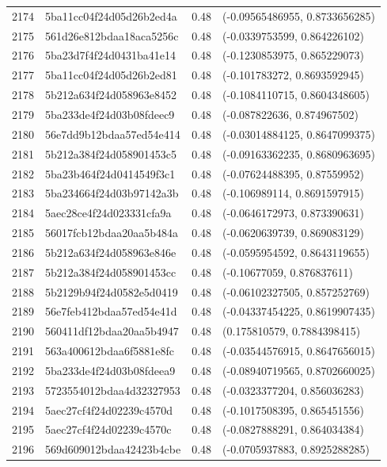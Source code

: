 \begin{table}[ht]
\begin{tabular}{rlrl}
  2174 & 5ba11cc04f24d05d26b2ed4a & 0.48 & (-0.09565486955, 0.8733656285) \\ 
  2175 & 561d26e812bdaa18aca5256c & 0.48 & (-0.0339753599, 0.864226102) \\ 
  2176 & 5ba23d7f4f24d0431ba41e14 & 0.48 & (-0.1230853975, 0.865229073) \\ 
  2177 & 5ba11cc04f24d05d26b2ed81 & 0.48 & (-0.101783272, 0.8693592945) \\ 
  2178 & 5b212a634f24d058963e8452 & 0.48 & (-0.1084110715, 0.8604348605) \\ 
  2179 & 5ba233de4f24d03b08fdeec9 & 0.48 & (-0.087822636, 0.874967502) \\ 
  2180 & 56e7dd9b12bdaa57ed54e414 & 0.48 & (-0.03014884125, 0.8647099375) \\ 
  2181 & 5b212a384f24d058901453c5 & 0.48 & (-0.09163362235, 0.8680963695) \\ 
  2182 & 5ba23b464f24d0414549f3c1 & 0.48 & (-0.07624488395, 0.87559952) \\ 
  2183 & 5ba234664f24d03b97142a3b & 0.48 & (-0.106989114, 0.8691597915) \\ 
  2184 & 5aec28ce4f24d023331cfa9a & 0.48 & (-0.0646172973, 0.873390631) \\ 
  2185 & 56017fcb12bdaa20aa5b484a & 0.48 & (-0.0620639739, 0.869083129) \\ 
  2186 & 5b212a634f24d058963e846e & 0.48 & (-0.0595954592, 0.8643119655) \\ 
  2187 & 5b212a384f24d058901453cc & 0.48 & (-0.10677059, 0.876837611) \\ 
  2188 & 5b2129b94f24d0582e5d0419 & 0.48 & (-0.06102327505, 0.857252769) \\ 
  2189 & 56e7feb412bdaa57ed54e41d & 0.48 & (-0.04337454225, 0.8619907435) \\ 
  2190 & 560411df12bdaa20aa5b4947 & 0.48 & (0.175810579, 0.7884398415) \\ 
  2191 & 563a400612bdaa6f5881e8fc & 0.48 & (-0.03544576915, 0.8647656015) \\ 
  2192 & 5ba233de4f24d03b08fdeea9 & 0.48 & (-0.08940719565, 0.8702660025) \\ 
  2193 & 5723554012bdaa4d32327953 & 0.48 & (-0.0323377204, 0.856036283) \\ 
  2194 & 5aec27cf4f24d02239c4570d & 0.48 & (-0.1017508395, 0.865451556) \\ 
  2195 & 5aec27cf4f24d02239c4570c & 0.48 & (-0.0827888291, 0.864034384) \\ 
  2196 & 569d609012bdaa42423b4cbe & 0.48 & (-0.0705937883, 0.8925288285) \\ 

\end{tabular}
\end{table}
